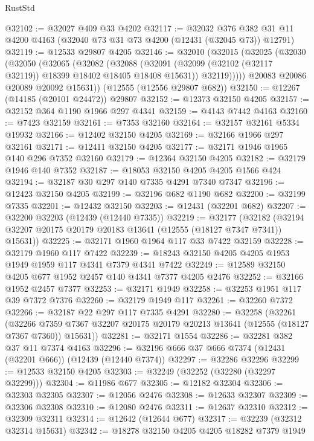 \begin{lexlean}{RustStd}
\begin{coremodule}
@32102 := @32027 @409 @33 @4202
@32117 := @32032
    @376
    @382
    @31
    @11
    @4200
    @4163
    (@32040 @73 @31 @73 @4200 (@12431 (@32045 @73)) @12791)
@32119 := @12533 @29807 @4205
@32146 := @32010
    (@32015
      (@32025
        (@32030
          (@32050
            (@32065
              (@32082
                (@32088
                  (@32091 (@32099 (@32102 (@32117 @32119)) @18399 @18402 @18405 @18408 @15631))
                  @32119)))))
        @20083
        @20086
        @20089
        @20092
        @15631))
    (@12555 (@12556 @29807 @682))
@32150 := @12267 (@14185 (@20101 @24472)) @29807
@32152 := @12373 @32150 @4205
@32157 := @32152 @364 @1190 @1966 @297 @4341
@32159 := @4143 @7442 @4163
@32160 := @7423 @32159
@32161 := @7353 @32160
@32164 := @32157 @32161 @5334 @19932
@32166 := @12402 @32150 @4205
@32169 := @32166 @1966 @297 @32161
@32171 := @12411 @32150 @4205
@32177 := @32171 @1946 @1965 @140 @296 @7352 @32160
@32179 := @12364 @32150 @4205
@32182 := @32179 @1946 @140 @7352
@32187 := @18053 @32150 @4205 @4205 @1566 @424
@32194 := @32187 @30 @297 @140 @7335 @4291 @7340 @7347
@32196 := @12423 @32150 @4205
@32199 := @32196 @682 @1190 @682
@32200 := @32199 @7335
@32201 := @12432 @32150
@32203 := @12431 (@32201 @682)
@32207 := @32200 @32203 (@12439 (@12440 @7335))
@32219 := @32177
    (@32182 (@32194 @32207 @20175 @20179 @20183 @13641 (@12555 (@18127 @7347 @7341)) @15631))
@32225 := @32171 @1960 @1964 @117 @33 @7422 @32159
@32228 := @32179 @1960 @117 @7422
@32239 := @18243 @32150 @4205 @4205 @1953 @1949 @1959 @117 @4341 @7379 @4341 @7422
@32249 := @12589 @32150 @4205 @677 @1952 @2457 @140 @4341 @7377 @4205 @2476
@32252 := @32166 @1952 @2457 @7377
@32253 := @32171 @1949
@32258 := @32253 @1951 @117 @39 @7372 @7376
@32260 := @32179 @1949 @117
@32261 := @32260 @7372
@32266 := @32187 @22 @297 @117 @7335 @4291
@32280 := @32258
    (@32261
      (@32266 @7359 @7367 @32207 @20175 @20179 @20213 @13641 (@12555 (@18127 @7367 @7360)) @15631))
@32281 := @32171 @1554
@32286 := @32281 @382 @37 @11 @7374 @4163
@32296 := @32196 @666 @37 @666 @7374 (@12431 (@32201 @666)) (@12439 (@12440 @7374))
@32297 := @32286 @32296
@32299 := @12533 @32150 @4205
@32303 := @32249 (@32252 (@32280 (@32297 @32299)))
@32304 := @11986 @677
@32305 := @12182 @32304
@32306 := @32303 @32305
@32307 := @12056 @2476
@32308 := @12633 @32307
@32309 := @32306 @32308
@32310 := @12080 @2476
@32311 := @12637 @32310
@32312 := @32309 @32311
@32314 := @12642 (@12644 @677)
@32317 := @32239 (@32312 @32314 @15631)
@32342 := @18278
    @32150
    @4205
    @4205
    @18282
    @7379
    @1949

\end{coremodule}
\end{lexlean}
